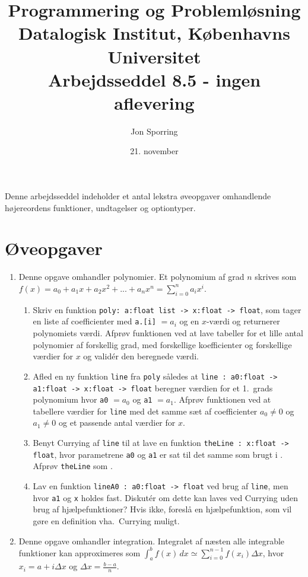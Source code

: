 \documentclass[a4paper,12pt]{article}
\title{Programmering og Problemløsning\\Datalogisk Institut,
  Københavns Universitet\\Arbejdsseddel 8.5 - ingen aflevering}
\author{Jon Sporring}
\date{21. november}
\begin{document}
\maketitle

\noindent
Denne arbejdsseddel indeholder et antal lekstra øveopgaver omhandlende højereordens funktioner, undtagelser og optiontyper.

\section*{Øveopgaver}
\begin{enumerate}[label=5ø.\arabic*,start=0]
\item Denne opgave omhandler polynomier. Et polynomium af grad $n$ skrives som $f(x) = a_0+a_1x+a_2x^2+...+a_nx^n = \sum_{i=0}^na_ix^i$.
  \begin{enumerate}
  \item Skriv en funktion \lstinline{poly: a:float list -> x:float -> float}, som tager en liste af coefficienter med \lstinline{a.[i]} $= a_i$ og en $x$-værdi og returnerer polynomiets værdi. Afprøv funktionen ved at lave tabeller for et lille antal polynomier af forskellig grad, med forskellige koefficienter og forskellige værdier for $x$ og valid\'{e}r den beregnede værdi.
  \item \label{line} Afled en ny funktion \lstinline{line} fra \lstinline{poly} således at \lstinline{line : a0:float -> a1:float -> x:float -> float} beregner værdien for et 1.\ grads polynomium hvor \lstinline{a0} $=a_0$ og \lstinline{a1} $=a_1$. Afprøv funktionen ved at tabellere værdier for \lstinline{line} med det samme sæt af coefficienter $a_0\neq 0$ og $a_1\neq 0$ og et passende antal værdier for $x$.
  \item \label{theLine} Benyt Currying af \lstinline{line} til at lave en funktion \lstinline{theLine : x:float -> float}, hvor parametrene \lstinline{a0} og \lstinline{a1} er sat til det samme som brugt i . Afprøv \lstinline{theLine} som .
  \item Lav en funktion \lstinline{lineA0 : a0:float -> float} ved brug af \lstinline{line}, men hvor \lstinline{a1} og \lstinline{x} holdes fast. Diskut\' {e}r om dette kan laves ved Currying uden brug af hjælpefunktioner? Hvis ikke, foreslå en hjælpefunktion, som vil gøre en definition vha.\ Currying muligt.
  \end{enumerate}
\item  Denne opgave omhandler integration. Integralet af næsten alle integrable funktioner kan approximeres som $\int_a^bf(x)\,dx\simeq\sum_{i=0}^{n-1}f(x_i)\Delta x$, hvor $x_i = a + i\Delta x$ og $\Delta x = \frac{b-a}{n}$.

\end{enumerate}
\end{document}
